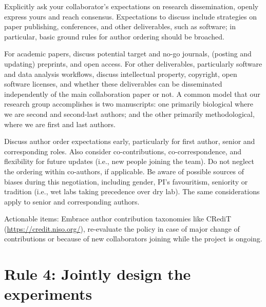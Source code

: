 \documentclass{article}
\begin{document}
Explicitly ask your collaborator's expectations on research dissemination, openly express yours and reach consensus. Expectations to discuss include strategies on paper publishing, conferences, and other deliverables, such as software; in particular, basic ground rules for author ordering should be broached.

For academic papers, discuss potential target and no-go journals, (posting and updating) preprints, and open access. For other deliverables, particularly software and data analysis workflows, discuss intellectual property, copyright, open software licenses, and whether these deliverables can be disseminated independently of the main collaboration paper or not. A common model that our research group accomplishes is two manuscripts: one primarily biological where we are second and second-last authors; and the other primarily methodological, where we are first and last authors.

Discuss author order expectations early, particularly for first author, senior and corresponding roles. Also consider co-contributions, co-correspondence, and flexibility for future updates (i.e., new people joining the team). Do not neglect the ordering within co-authors, if applicable. Be aware of possible sources of biases during this negotiation, including gender, PI's favouritism, seniority or tradition (i.e., wet labs taking precedence over dry lab). The same considerations apply to senior and corresponding authors. 

Actionable items: Embrace author contribution taxonomies like CRediT \cite{allen2014publishing} (\url{https://credit.niso.org/}), re-evaluate the policy in case of major change of contributions or because of new collaborators joining while the project is ongoing.

\section*{Rule 4: Jointly design the experiments} %
\label{rule4_experiments}

\end{document}
